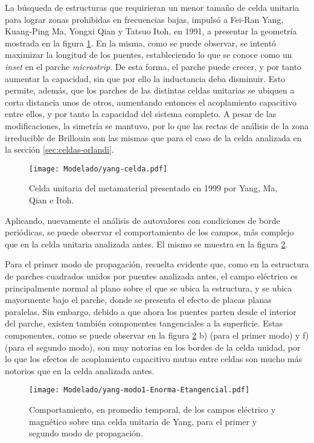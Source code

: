 La búsqueda de estructuras que requirieran un menor tamaño de celda unitaria para lograr zonas prohibidas en frecuencias bajas, impulsó a Fei-Ran Yang, Kuang-Ping Ma, Yongxi Qian y Tatsuo Itoh, en 1991, a presentar \cite{Yang:UCPBG} la geometría mostrada en la figura \ref{fig:celda-yang}. En la misma, como se puede observar, se intentó maximizar la longitud de los puentes, estableciendo lo que se conoce como un \textit{inset} en el parche \textit{microstrip}. De esta forma, el parche puede crecer, y por tanto aumentar la capacidad, sin que por ello la inductancia deba disminuir. Esto permite, además, que los parches de las distintas celdas unitarias se ubiquen a corta distancia unos de otros, aumentando entonces el acoplamiento capacitivo entre ellos, y por tanto la capacidad del sistema completo. A pesar de las modificaciones, la simetría se mantuvo, por lo que las rectas de análisis de la zona irreducible de Brillouin son las mismas que para el caso de la celda analizada en la sección \ref{sec:celdas-orlandi}.

\begin{figure}[h]
	\centering
	\texttt{[image: Modelado/yang-celda.pdf]}
	\caption{Celda unitaria del metamaterial presentado en 1999 por Yang, Ma, Qian e Itoh.}
	\label{fig:celda-yang}
\end{figure}

Aplicando, nuevamente el análisis de autovalores con condiciones de borde periódicas, se puede observar el comportamiento de los campos, más complejo que en la celda unitaria analizada antes. El mismo se muestra en la figura \ref{fig:yang-analisis-campos}.

Para el primer modo de propagación, resuelta evidente que, como en la estructura de parches cuadrados unidos por puentes analizada antes, el campo eléctrico es principalmente normal al plano sobre el que se ubica la estructura, y se ubica mayormente bajo el parche, donde se presenta el efecto de placas planas paralelas. Sin embargo, debido  a que ahora los puentes parten desde el interior del parche, existen también componentes tangenciales a la superficie. Estas componentes, como se puede observar en la figura \ref{fig:yang-analisis-campos} b) (para el primer modo) y f) (para el segundo modo), son muy notorias en los bordes de la celda unidad, por lo que los efectos de acoplamiento capacitivo mutuo entre celdas son mucho más notorios que en la celda analizada antes.

\begin{figure}[h]
	\centering
	\texttt{[image: Modelado/yang-modo1-Enorma-Etangencial.pdf]}
	\caption{Comportamiento, en promedio temporal, de los campos eléctrico y magnético sobre una celda unitaria de Yang, para el primer y segundo modo de propagación.}
	\label{fig:yang-analisis-campos}
\end{figure}

